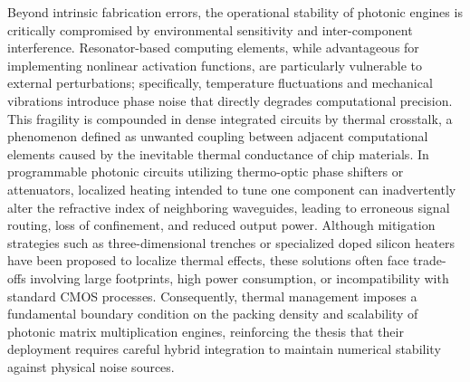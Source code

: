 \documentclass[11pt]{article}
\begin{document}
Beyond intrinsic fabrication errors, the operational stability of photonic engines is critically compromised by environmental sensitivity and inter-component interference. Resonator-based computing elements, while advantageous for implementing nonlinear activation functions, are particularly vulnerable to external perturbations; specifically, temperature fluctuations and mechanical vibrations introduce phase noise that directly degrades computational precision. This fragility is compounded in dense integrated circuits by thermal crosstalk, a phenomenon defined as unwanted coupling between adjacent computational elements caused by the inevitable thermal conductance of chip materials. \citep{doi_10_1109_access_2020_3013116_8fec1fb2} In programmable photonic circuits utilizing thermo-optic phase shifters or attenuators, localized heating intended to tune one component can inadvertently alter the refractive index of neighboring waveguides, leading to erroneous signal routing, loss of confinement, and reduced output power. Although mitigation strategies such as three-dimensional trenches or specialized doped silicon heaters have been proposed to localize thermal effects, these solutions often face trade-offs involving large footprints, high power consumption, or incompatibility with standard CMOS processes. Consequently, thermal management imposes a fundamental boundary condition on the packing density and scalability of photonic matrix multiplication engines, reinforcing the thesis that their deployment requires careful hybrid integration to maintain numerical stability against physical noise sources. \citep{doi_10_3390_nano14080697_c372a140} \citep{doi_10_1109_access_2020_3013116_8fec1fb2}
\end{document}
